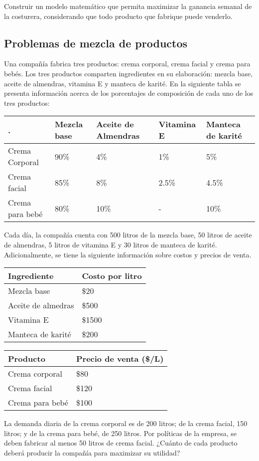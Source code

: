 Construir un modelo matemático que permita maximizar la ganancia semanal
de la costurera, considerando que todo producto que fabrique puede
venderlo.



    \hypertarget{problemas-de-mezcla-de-productos}{%
	\subsection{Problemas de mezcla de
		productos}\label{problemas-de-mezcla-de-productos}}

Una compañía fabrica tres productos: crema corporal, crema facial y
crema para bebés. Los tres productos comparten ingredientes en su
elaboración: mezcla base, aceite de almendras, vitamina E y manteca de
karité. En la siguiente tabla se presenta información acerca de los
porcentajes de composición de cada uno de los tres productos:

\begin{longtable}[]{@{}lllll@{}}
\toprule
. & Mezcla base & Aceite de Almendras & Vitamina E & Manteca de
karité \\
\midrule
\endhead
Crema Corporal & 90\% & 4\% & 1\% & 5\% \\
Crema facial & 85\% & 8\% & 2.5\% & 4.5\% \\
Crema para bebé & 80\% & 10\% & - & 10\% \\
\bottomrule
\end{longtable}

Cada día, la compañía cuenta con 500 litros de la mezcla base, 50 litros
de aceite de almendras, 5 litros de vitamina E y 30 litros de manteca de
karité. Adicionalmente, se tiene la siguiente información sobre costos y
precios de venta.

\begin{longtable}[]{@{}ll@{}}
\toprule
Ingrediente & Costo por litro \\
\midrule
\endhead
Mezcla base & \$20 \\
Aceite de almedras & \$500 \\
Vitamina E & \$1500 \\
Manteca de karité & \$200 \\
\bottomrule
\end{longtable}

\begin{longtable}[]{@{}ll@{}}
\toprule
Producto & Precio de venta (\$/L) \\
\midrule
\endhead
Crema corporal & \$80 \\
Crema facial & \$120 \\
Crema para bebé & \$100 \\
\bottomrule
\end{longtable}

La demanda diaria de la crema corporal es de 200 litros; de la crema
facial, 150 litros; y de la crema para bebé, de 250 litros. Por
políticas de la empresa, se deben fabricar al menos 50 litros de crema
facial. ¿Cuánto de cada producto deberá producir la compañía para
maximizar su utilidad?


